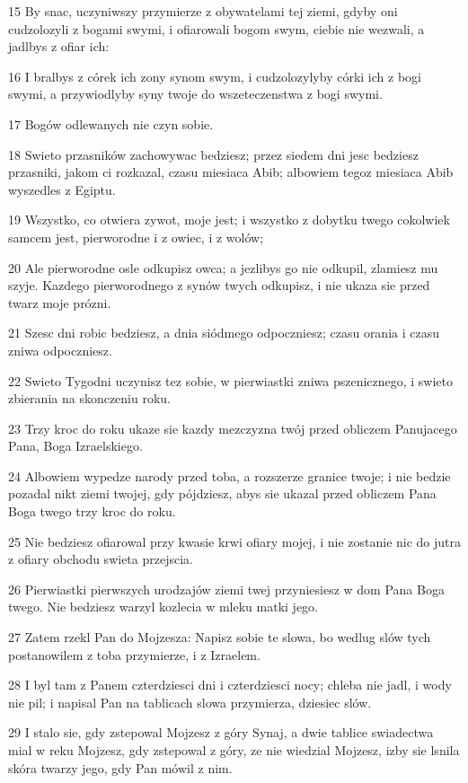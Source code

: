 \par 15 By snac, uczyniwszy przymierze z obywatelami tej ziemi, gdyby oni cudzolozyli z bogami swymi, i ofiarowali bogom swym, ciebie nie wezwali, a jadlbys z ofiar ich:
\par 16 I bralbys z córek ich zony synom swym, i cudzolozylyby córki ich z bogi swymi, a przywiodlyby syny twoje do wszeteczenstwa z bogi swymi.
\par 17 Bogów odlewanych nie czyn sobie.
\par 18 Swieto przasników zachowywac bedziesz; przez siedem dni jesc bedziesz przasniki, jakom ci rozkazal, czasu miesiaca Abib; albowiem tegoz miesiaca Abib wyszedles z Egiptu.
\par 19 Wszystko, co otwiera zywot, moje jest; i wszystko z dobytku twego cokolwiek samcem jest, pierworodne i z owiec, i z wolów;
\par 20 Ale pierworodne osle odkupisz owca; a jezlibys go nie odkupil, zlamiesz mu szyje. Kazdego pierworodnego z synów twych odkupisz, i nie ukaza sie przed twarz moje prózni.
\par 21 Szesc dni robic bedziesz, a dnia siódmego odpoczniesz; czasu orania i czasu zniwa odpoczniesz.
\par 22 Swieto Tygodni uczynisz tez sobie, w pierwiastki zniwa pszenicznego, i swieto zbierania na skonczeniu roku.
\par 23 Trzy kroc do roku ukaze sie kazdy mezczyzna twój przed obliczem Panujacego Pana, Boga Izraelskiego.
\par 24 Albowiem wypedze narody przed toba, a rozszerze granice twoje; i nie bedzie pozadal nikt ziemi twojej, gdy pójdziesz, abys sie ukazal przed obliczem Pana Boga twego trzy kroc do roku.
\par 25 Nie bedziesz ofiarowal przy kwasie krwi ofiary mojej, i nie zostanie nic do jutra z ofiary obchodu swieta przejscia.
\par 26 Pierwiastki pierwszych urodzajów ziemi twej przyniesiesz w dom Pana Boga twego. Nie bedziesz warzyl kozlecia w mleku matki jego.
\par 27 Zatem rzekl Pan do Mojzesza: Napisz sobie te slowa, bo wedlug slów tych postanowilem z toba przymierze, i z Izraelem.
\par 28 I byl tam z Panem czterdziesci dni i czterdziesci nocy; chleba nie jadl, i wody nie pil; i napisal Pan na tablicach slowa przymierza, dziesiec slów.
\par 29 I stalo sie, gdy zstepowal Mojzesz z góry Synaj, a dwie tablice swiadectwa mial w reku Mojzesz, gdy zstepowal z góry, ze nie wiedzial Mojzesz, izby sie lsnila skóra twarzy jego, gdy Pan mówil z nim.
